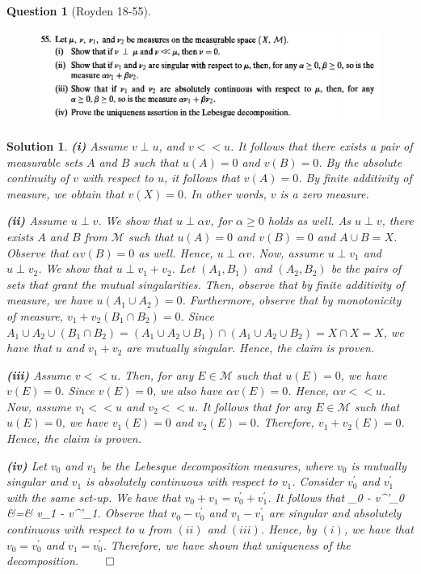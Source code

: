 \documentclass{article} %
\def\eQb#1\eQe{\begin{eqnarray*}#1\end{eqnarray*}}
\theoremstyle{quest}
\newtheorem*{question}{Question}
\newtheorem*{solution}{Solution}
\begin{document}
\begin{question}[Royden 18-55]
\hfill
\begin{figure}[h!]
  \centering
    \includegraphics[width=1\textwidth]{rv-18-55.png}
\end{figure}
\end{question}
\begin{solution}
\textbf{(i)} Assume $v \perp u$, and $ v << u$. It follows that
there exists a pair of measurable sets $A$ and $B$ such that 
$u(A) = 0$ and $v(B) = 0$. By the absolute continuity of $v$ with respect
to $u$, it follows that $v(A) = 0$. By finite additivity of measure, we
obtain that $v(X) = 0$. In other words, $v$ is a zero measure.

\smallskip

\textbf{(ii)} 
Assume $u \perp v$. We show that $u \perp \alpha v$, for $\alpha \geq 0$
holds as well.
As $u \perp v$, there exists $A$ and $B$ from $\mathscr{M}$ such that
$u(A) = 0$ and $v(B) = 0$ and $A \cup B = X$. Observe that
$\alpha v(B) = 0$ as well. Hence, $u \perp \alpha v$. Now, assume
$u \perp v_1$ and $u \perp v_2$. We show that $u \perp v_1 + v_2$.
Let $(A_1, B_1)$ and $(A_2,B_2)$ be the pairs of sets that grant
the mutual singularities. Then, observe that by finite additivity of 
measure, we have $u(A_1 \cup A_2) = 0$. Furthermore, observe that
by monotonicity of measure, $v_1 + v_2(B_1 \cap B_2) = 0$. Since
$A_1 \cup A_2 \cup (B_1 \cap B_2) = (A_1 \cup A_2 \cup B_1) \cap
(A_1 \cup A_2 \cup B_2) = X \cap X = X$, we have that $u$ and $v_1 + v_2$
are mutually singular. Hence, the claim is proven. 

\smallskip

\textbf{(iii)} 
Assume $v << u$. Then, for any $E \in \mathscr{M}$ such that
$u(E) = 0$, we have $v(E) = 0$. Since $v(E) = 0
$, we also have $\alpha v(E) = 0$. Hence, $\alpha v << u$. Now, 
assume $v_1 << u$ and $v_2 << u$. It follows that for any 
$E \in \mathscr{M}$ such that $u(E) = 0$, we have $v_1(E) = 0$ and
$v_2(E) = 0$. Therefore, $v_1+v_2(E) = 0$. Hence, the claim is proven.

\bigskip

\textbf{(iv)} Let $v_0$ and $v_1$ be the Lebesque decomposition measures,
where $v_0$ is mutually singular and $v_1$ is absolutely continuous with
respect to $v_1$. Consider $v^{'}_0$ and $v^{'}_1$ with the same set-up.
We have that $v_0 + v_1 = v^{'}_0 + v^{'}_1$. It follows that
\eQb
v_0 - v^{'}_0 &=& v_1 - v^{'}_1.
\eQe  
Observe that $v_0 - v^{'}_0$ and $v_1 - v^{'}_1$ are singular and
absolutely continuous with respect to $u$ from $(ii)$ and $(iii)$. 
Hence, by $(i)$, we have that $v_0 = v^{'}_0$ and $v_1 = v^{'}_0$.
Therefore, we have shown that uniqueness of the decomposition. 
\hfill $\qed$
 

\end{solution}
\end{document}
